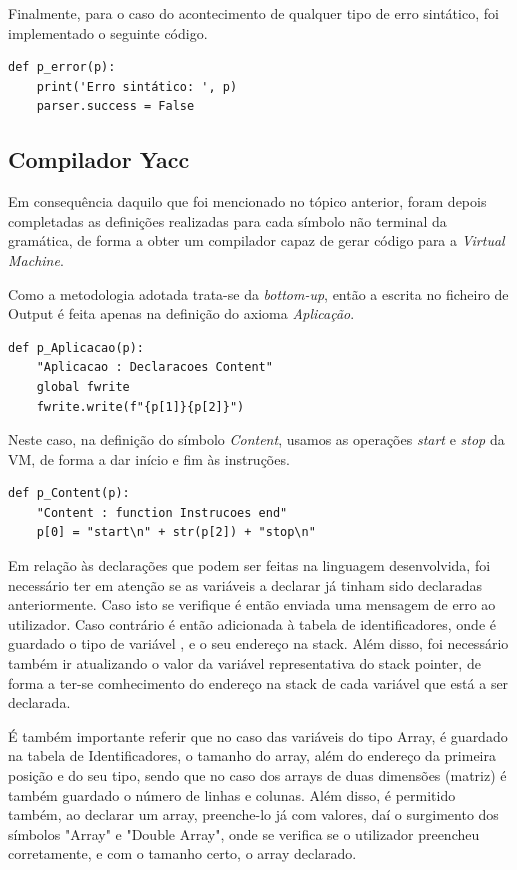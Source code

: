 \documentclass[11pt,a4paper]{report}
\begin{document}
Finalmente, para o caso do acontecimento de qualquer tipo de erro sintático, foi implementado o seguinte código.
\begin{verbatim}
def p_error(p):
    print('Erro sintático: ', p)
    parser.success = False
\end{verbatim}

\subsection{Compilador Yacc}
Em consequência daquilo que foi mencionado no tópico anterior, foram depois completadas as definições realizadas para cada símbolo não terminal da gramática, de forma a obter um compilador capaz de gerar código para a \textit{Virtual Machine}. 

Como a metodologia adotada trata-se da \textit{bottom-up}, então a escrita no ficheiro de Output é feita apenas na definição do axioma \textit{Aplicação}.
\begin{verbatim}
def p_Aplicacao(p):
    "Aplicacao : Declaracoes Content"
    global fwrite 
    fwrite.write(f"{p[1]}{p[2]}")
\end{verbatim}
Neste caso, na definição do símbolo \textit{Content}, usamos as operações \textit{start} e \textit{stop} da VM, de forma a dar início e fim às instruções.
\begin{verbatim}
def p_Content(p):
    "Content : function Instrucoes end"
    p[0] = "start\n" + str(p[2]) + "stop\n"
\end{verbatim}
Em relação às declarações que podem ser feitas na linguagem desenvolvida, foi necessário ter em atenção se as variáveis a declarar já tinham sido declaradas anteriormente. Caso isto se verifique é então enviada uma mensagem de erro ao utilizador. Caso contrário é então adicionada à tabela de identificadores, onde é guardado o tipo de variável , e o seu endereço na stack. Além disso, foi necessário também ir atualizando o valor da variável representativa do stack pointer, de forma a ter-se comhecimento do endereço na stack de cada variável que está a ser declarada. \par
É também importante referir que no caso das variáveis do tipo Array, é guardado na tabela de Identificadores, o tamanho do array, além do endereço da primeira posição e do seu tipo, sendo que no caso dos arrays de duas dimensões (matriz) é também guardado o número de linhas e colunas.
Além disso, é permitido também, ao declarar um array, preenche-lo já com valores, daí o surgimento dos símbolos "Array" e "Double Array", onde se verifica se o utilizador preencheu corretamente, e com o tamanho certo, o array declarado.
\end{document}

